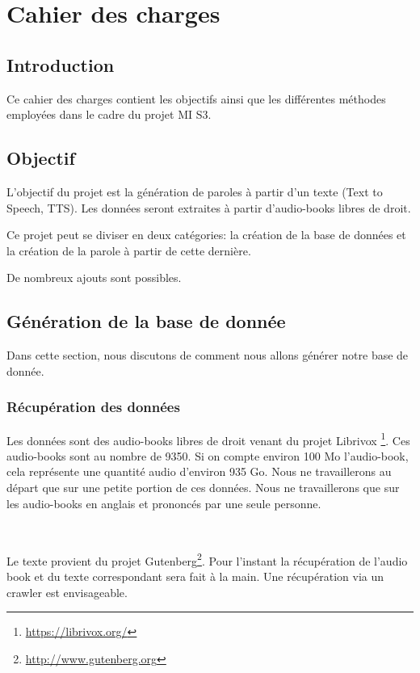 \chapter{Cahier des charges}
	
	\section*{Introduction}

		Ce cahier des charges contient les objectifs ainsi que les différentes
	méthodes employées dans le cadre du projet MI S3.
	
	\section{Objectif}
	
		L'objectif du projet est la génération de paroles à partir d'un texte
	(Text to Speech, TTS). Les données seront extraites à partir d'audio-books
	libres de droit.
	
		Ce projet peut se diviser en deux catégories: la création de la base de
	données et la création de la parole à partir de cette dernière.
	
		De nombreux ajouts sont possibles.
		
	\section{Génération de la base de donnée}
	
	Dans cette section, nous discutons de comment nous allons générer notre
	base de donnée.
	
		\subsection{Récupération des données}
		
		Les données sont des audio-books libres de droit venant du projet Librivox
	\footnote{\url{https://librivox.org/}}.
	Ces audio-books sont au nombre de 9350. Si on compte environ 100 Mo 
	l'audio-book, cela représente une quantité audio d'environ 935 Go.
	Nous ne travaillerons au départ que sur une petite portion de ces données.
	Nous ne travaillerons que sur les audio-books en anglais et prononcés par une
	seule personne.
	
	~
	
	Le texte provient du projet 
	Gutenberg\footnote{\url{http://www.gutenberg.org}}.
	Pour l'instant la récupération de l'audio book et du texte correspondant
	sera fait à la main. Une récupération via un crawler est envisageable.
	

